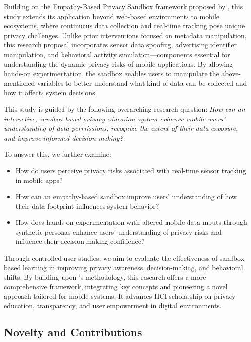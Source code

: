 \documentclass[acmlarge, nonacm]{acmart}
\begin{document}
Building on the Empathy-Based Privacy Sandbox framework proposed by \citet{Chaoran2023EmpathySandbox}, this study extends its application beyond web-based environments to mobile ecosystems, where continuous data collection and real-time tracking pose unique privacy challenges. Unlike prior interventions focused on metadata manipulation, this research proposal incorporates sensor data spoofing, advertising identifier manipulation, and behavioral activity simulation—components essential for understanding the dynamic privacy risks of mobile applications. By allowing hands-on experimentation, the sandbox enables users to manipulate the above-mentioned variables to better understand what kind of data can be collected and how it affects system decisions.

This study is guided by the following overarching research question: \textit{How can an interactive, sandbox-based privacy education system enhance mobile users' understanding of data permissions, recognize the extent of their data exposure, and improve informed decision-making?}

To answer this, we further examine:
\begin{itemize}
    \item How do users perceive privacy risks associated with real-time sensor tracking in mobile apps?
    \item How can an empathy-based sandbox improve users’ understanding of how their data footprint influences system behavior?
    \item How does hands-on experimentation with altered mobile data inputs through synthetic personas enhance users’ understanding of privacy risks and influence their decision-making confidence?
\end{itemize}

Through controlled user studies, we aim to evaluate the effectiveness of sandbox-based learning in improving privacy awareness, decision-making, and behavioral shifts. By building upon \citet{Chaoran2023EmpathySandbox}'s methodology, this research offers a more comprehensive framework, integrating key concepts and pioneering a novel approach tailored for mobile systems. It advances HCI scholarship on privacy education, transparency, and user empowerment in digital environments.


\subsection{Novelty and Contributions}
\end{document}
